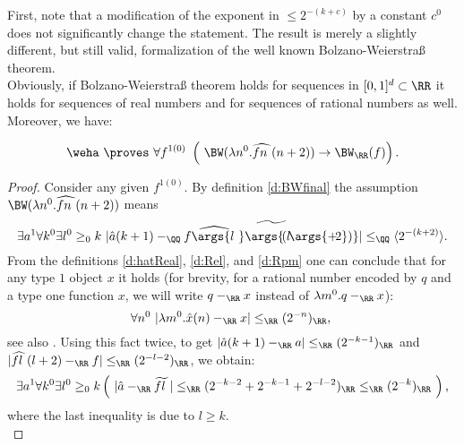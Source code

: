 First, note that a modification of the exponent in $\leq 2^{-(k+c)}$ by a constant $c^0$ does
not significantly change the statement. The result is merely a slightly
 different, but still valid, formalization of the well known Bolzano-Weierstra{\ss} theorem.\\
Obviously, if Bolzano-Weierstra{\ss} theorem holds for sequences in $[0,1]^d\subset\RR$ it holds 
for sequences of real numbers and for sequences of rational numbers as well. Moreover, we have:
\begin{prop}\label{p:BWimpBWR}
\[
\weha\ \proves\ \forall f^{1(0)}\ \left(\ \BW(\lambda n^0.\widehat{fn\ }(n+2))\rightarrow\BW_\RR(f) \right)
\text{.}
\]
\end{prop}
\begin{proof}
Consider any given $f^{1(0)}$. By definition \ref{d:BWfinal} the assumption $\BW(\lambda n^0.\widehat{fn\ }(n+2))$ means
\[
\exists a^1\forall k^0\exists l^0\geq_0 k
     \ |\hat a(k+1)-_\QQ \widetilde {\widehat{f\args{l\ }}\args{\!(l\!\args{+\!2})}}|\leq_\QQ\langle2^{-(k+2)}\rangle
\text{.}
\]
From the definitions \ref{d:hatReal}, \ref{d:Rel}, and \ref{d:Rpm}
one can conclude that for any type $1$ object $x$ it holds (for brevity, for a rational number
encoded by $q$  and a type one function $x$, 
we will write $q-_\RR x$ instead of $\lambda m^0.q-_\RR x$): 
\[
\forall n^0\ |\lambda m^0.\hat x(n)-_\RR x|\leq_\RR (2^{-n})_\RR
\text{, }
\]
see also \cite{Kohlenbach08}. 
Using this fact twice, to get $|\hat a(k+1)-_\RR a|\leq_\RR (2^{-k-1})_\RR$ 
and $|\widehat {fl\ }(l+2)-_\RR f|\leq_\RR (2^{-l-2})_\RR$, we
obtain:
\[
\exists a^1\forall k^0\exists l^0\geq_0 k\left(
     \ |\hat a-_\RR \widetilde {fl\ }|\leq_\RR (2^{-k-2}+2^{-k-1}+2^{-l-2})_\RR
     \leq_\RR(2^{-k})_\RR\ \right)
\text{,}
\]
where the last inequality is due to $l\geq k$.\\
\end{proof}
%


